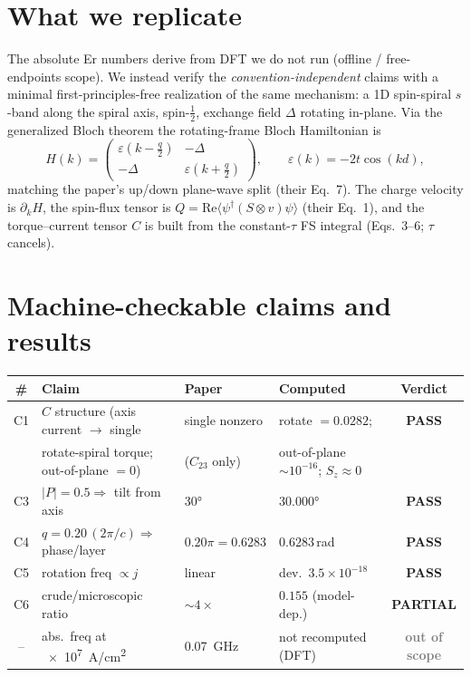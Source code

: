 \documentclass[11pt]{article}
\newcommand{\pass}{\textcolor{green!55!black}{\textbf{PASS}}}
\newcommand{\partialv}{\textcolor{orange!85!black}{\textbf{PARTIAL}}}
\newcommand{\oos}{\textcolor{gray}{\textbf{out of scope}}}
\begin{document}
\section{What we replicate}
The absolute Er numbers derive from DFT we do not run (offline / free-endpoints
scope). We instead verify the \emph{convention-independent} claims with a
minimal first-principles-free realization of the same mechanism: a 1D
spin-spiral $s$-band along the spiral axis, spin-$\tfrac12$, exchange field
$\Delta$ rotating in-plane. Via the generalized Bloch theorem the rotating-frame
Bloch Hamiltonian is
\begin{equation}
  H(k)=\begin{pmatrix}\varepsilon(k-\tfrac{q}{2}) & -\Delta\\ -\Delta & \varepsilon(k+\tfrac{q}{2})\end{pmatrix},
  \qquad \varepsilon(k)=-2t\cos(kd),
\end{equation}
matching the paper's up/down plane-wave split (their Eq.~7). The charge velocity
is $\partial_k H$, the spin-flux tensor is $Q=\mathrm{Re}\langle\psi^\dagger
(S\otimes v)\psi\rangle$ (their Eq.~1), and the torque--current tensor $C$ is
built from the constant-$\tau$ FS integral (Eqs.~3--6; $\tau$ cancels).

\section{Machine-checkable claims and results}
\begin{table}[h]\centering
\begin{tabular}{clllc}
\toprule
\# & Claim & Paper & Computed & Verdict\\
\midrule
C1 & $C$ structure (axis current $\to$ single & single nonzero & rotate $=0.0282$; & \pass\\
   & rotate-spiral torque; out-of-plane $=0$) & ($C_{23}$ only) & out-of-plane $\sim\!10^{-16}$; $S_z\!\approx\!0$ & \\
C3 & $|P|=0.5\Rightarrow$ tilt from axis & \ang{30} & \ang{30.000} & \pass\\
C4 & $q=0.20\,(2\pi/c)\Rightarrow$ phase/layer & $0.20\pi=0.6283$ & $0.6283$\,rad & \pass\\
C5 & rotation freq $\propto j$ & linear & dev.\ $3.5\times10^{-18}$ & \pass\\
C6 & crude/microscopic ratio & $\sim4\times$ & $0.155$ (model-dep.) & \partialv\\
-- & abs.\ freq at \SI{e7}{A/cm^2} & \SI{0.07}{GHz} & not recomputed (DFT) & \oos\\
\bottomrule
\end{tabular}
\end{table}
\end{document}
